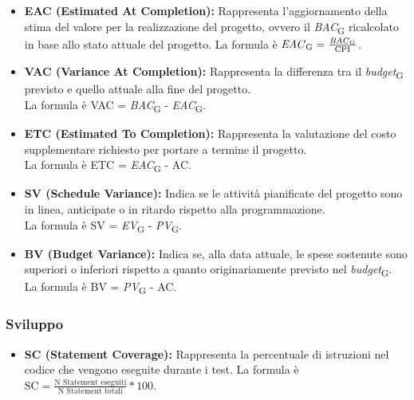 \begin{itemize}
    \item \textbf{EAC (Estimated At Completion):} Rappresenta l'aggiornamento della stima del valore per la realizzazione del progetto, ovvero il \textit{BAC}\textsubscript{G} ricalcolato in base allo stato attuale del progetto.
    La formula è \( \text{\textit{EAC}\textsubscript{G}} = \frac{\text{\textit{BAC}\textsubscript{G}}}{\text{CPI}} \).
    \item \textbf{VAC (Variance At Completion):} Rappresenta la differenza tra il \textit{budget}\textsubscript{G} previsto e quello attuale alla fine del progetto.\\
    La formula è VAC = \textit{BAC}\textsubscript{G} - \textit{EAC}\textsubscript{G}.
    \item \textbf{ETC (Estimated To Completion):} Rappresenta la valutazione del costo supplementare richiesto per portare a termine il progetto.\\
    La formula è ETC = \textit{EAC}\textsubscript{G} - AC.
    \item \textbf{SV (Schedule Variance):} Indica se le attività pianificate del progetto sono in linea, anticipate o in ritardo rispetto alla programmazione.\\
    La formula è SV = \textit{EV}\textsubscript{G} - \textit{PV}\textsubscript{G}.
    \item \textbf{BV (Budget Variance):} Indica se, alla data attuale, le spese sostenute sono superiori o inferiori rispetto a quanto originariamente previsto nel \textit{budget}\textsubscript{G}.\\
    La formula è BV = \textit{PV}\textsubscript{G} - AC.
\end{itemize}
\newpage
\subsubsection{Sviluppo}
\begin{itemize}
    \item \textbf{SC (Statement Coverage):} Rappresenta la percentuale di istruzioni nel codice che vengono eseguite durante i test.
    La formula è \( \text{SC} = \frac{\text{N Statement eseguiti}}{\text{N Statement totali}}*100 \).
\end{itemize}
